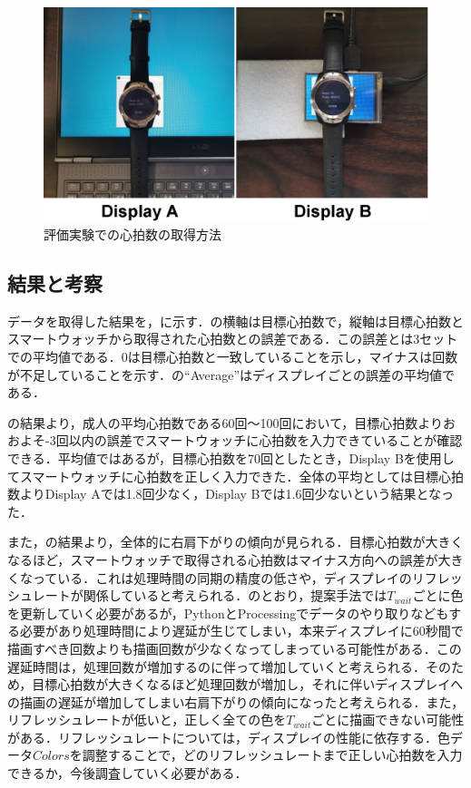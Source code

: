 \documentclass[Japanese,noauthor]{dicomopapers}
\begin{document}
\begin{figure}[!t]
	\begin{center}
		\includegraphics[width=1\linewidth]{figures/smartwatches.eps}
	\end{center}
	\caption{評価実験での心拍数の取得方法}
	\label{fig:smartwatches}
\end{figure}



\subsection{結果と考察}
データを取得した結果を，に示す．の横軸は目標心拍数で，縦軸は目標心拍数とスマートウォッチから取得された心拍数との誤差である．この誤差とは3セットでの平均値である．0は目標心拍数と一致していることを示し，マイナスは回数が不足していることを示す．の``Average''はディスプレイごとの誤差の平均値である．\par

の結果より，成人の平均心拍数である60回～100回において，目標心拍数よりおおよそ-3回以内の誤差でスマートウォッチに心拍数を入力できていることが確認できる．平均値ではあるが，目標心拍数を70回としたとき，Display Bを使用してスマートウォッチに心拍数を正しく入力できた．全体の平均としては目標心拍数よりDisplay Aでは1.8回少なく，Display Bでは1.6回少ないという結果となった．\par

また，の結果より，全体的に右肩下がりの傾向が見られる．目標心拍数が大きくなるほど，スマートウォッチで取得される心拍数はマイナス方向への誤差が大きくなっている．これは処理時間の同期の精度の低さや，ディスプレイのリフレッシュレートが関係していると考えられる．のとおり，提案手法では$T_{wait}$ごとに色を更新していく必要があるが，PythonとProcessingでデータのやり取りなどもする必要があり処理時間により遅延が生じてしまい，本来ディスプレイに60秒間で描画すべき回数よりも描画回数が少なくなってしまっている可能性がある．この遅延時間は，処理回数が増加するのに伴って増加していくと考えられる．そのため，目標心拍数が大きくなるほど処理回数が増加し，それに伴いディスプレイへの描画の遅延が増加してしまい右肩下がりの傾向になったと考えられる．また，リフレッシュレートが低いと，正しく全ての色を$T_{wait}$ごとに描画できない可能性がある．リフレッシュレートについては，ディスプレイの性能に依存する．色データ$Colors$を調整することで，どのリフレッシュレートまで正しい心拍数を入力できるか，今後調査していく必要がある．\par
\end{document}

